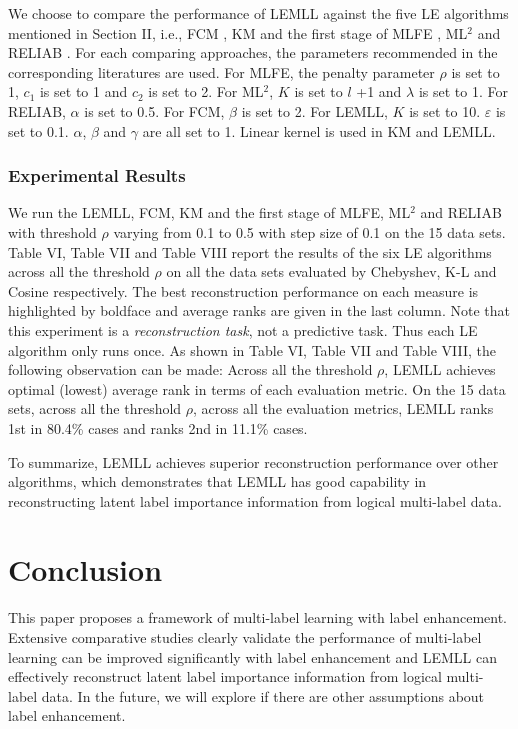 \documentclass[conference]{IEEEtran}
\begin{document}
We choose to compare the performance of LEMLL against the five LE algorithms mentioned in Section II, i.e., FCM \cite{el2006study}, KM \cite{jiang2006fuzzy} and the first stage of MLFE \cite{zhang2018feature}, ML$^2$ \cite{hou2016multi} and RELIAB \cite{li2015leveraging}. For each comparing approaches, the parameters recommended in the corresponding literatures are used. For MLFE,  the penalty parameter $\rho$ is set to 1, $c_1$ is set to 1 and $c_2$ is set to 2. For ML$^2$, $K$ is set to $l$ +1 and $\lambda$ is set to 1. For RELIAB, $\alpha$ is set to 0.5. For FCM, $\beta$ is set to 2. For LEMLL, $K$ is set to 10. $\varepsilon$ is set to 0.1. $\alpha$, $\beta$ and $\gamma$ are all set to 1. Linear kernel is used in KM and LEMLL.

\subsubsection{Experimental Results}
We run the LEMLL, FCM, KM and the first stage of MLFE, ML$^2$ and RELIAB with threshold $\rho$ varying from 0.1 to 0.5 with step size of 0.1 on the 15 data sets. Table VI, Table VII and Table VIII report the results of the six LE algorithms across all the threshold $\rho$ on all the data sets evaluated by  Chebyshev, K-L and Cosine respectively. The best reconstruction performance on each measure is highlighted by boldface and average ranks are given in the last column. Note that this experiment is a \emph{reconstruction task}, not a predictive task. Thus each LE algorithm only runs once. As shown in Table VI, Table VII and Table VIII, the following observation can be made: Across all the threshold $\rho$, LEMLL achieves optimal (lowest) average rank in terms of each evaluation metric. On the 15 data sets, across all the threshold $\rho$, across all the evaluation metrics, LEMLL ranks 1st in 80.4\% cases and ranks 2nd in 11.1\% cases.

To summarize, LEMLL achieves superior reconstruction performance over other algorithms, which demonstrates that LEMLL has good capability in reconstructing latent label importance information from logical multi-label data.

\section{Conclusion}
This paper proposes a framework of multi-label learning with label enhancement. Extensive comparative studies clearly validate the performance of multi-label learning can be improved significantly with label enhancement and LEMLL can effectively reconstruct latent label importance information from logical multi-label data. In the future, we will explore if there are other assumptions about label enhancement.
\end{document}
